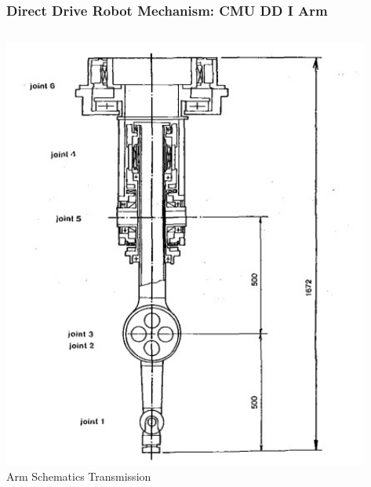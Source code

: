 \begin{frame}
	\frametitle{Direct Drive Robot Mechanism: CMU DD I Arm}
	\begin{columns}[t]	
		\begin{column}{.45\columnwidth}
			\begin{minipage}[b]{\textwidth}
				\includegraphics[width=1.2\textwidth, height=1.5\textwidth]{figures/cmu_arm.jpg} \\
				\footnotesize{Arm Schematics Transmission} %
		\end{minipage}
	\end{column}
	\begin{column}{.45\columnwidth}
		\begin{minipage}[b]{\textwidth}

\end{minipage}
\end{column}
\end{columns}
\end{frame}
